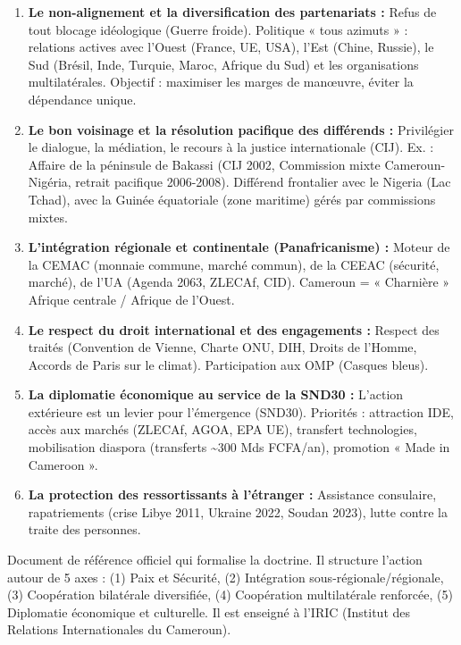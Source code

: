 \documentclass[11pt]{article}
\begin{document}
\begin{propriete}
\begin{enumerate}
    \item \textbf{Le non-alignement et la diversification des partenariats :} Refus de tout blocage idéologique (Guerre froide). Politique « tous azimuts » : relations actives avec l'Ouest (France, UE, USA), l'Est (Chine, Russie), le Sud (Brésil, Inde, Turquie, Maroc, Afrique du Sud) et les organisations multilatérales. Objectif : maximiser les marges de manœuvre, éviter la dépendance unique.
    \item \textbf{Le bon voisinage et la résolution pacifique des différends :} Privilégier le dialogue, la médiation, le recours à la justice internationale (CIJ). Ex. : Affaire de la péninsule de Bakassi (CIJ 2002, Commission mixte Cameroun-Nigéria, retrait pacifique 2006-2008). Différend frontalier avec le Nigeria (Lac Tchad), avec la Guinée équatoriale (zone maritime) gérés par commissions mixtes.
    \item \textbf{L'intégration régionale et continentale (Panafricanisme) :} Moteur de la CEMAC (monnaie commune, marché commun), de la CEEAC (sécurité, marché), de l'UA (Agenda 2063, ZLECAf, CID). Cameroun = « Charnière » Afrique centrale / Afrique de l'Ouest.
    \item \textbf{Le respect du droit international et des engagements :} Respect des traités (Convention de Vienne, Charte ONU, DIH, Droits de l'Homme, Accords de Paris sur le climat). Participation aux OMP (Casques bleus).
    \item \textbf{La diplomatie économique au service de la SND30 :} L'action extérieure est un levier pour l'émergence (SND30). Priorités : attraction IDE, accès aux marchés (ZLECAf, AGOA, EPA UE), transfert technologies, mobilisation diaspora (transferts \textasciitilde 300 Mds FCFA/an), promotion « Made in Cameroon ».
    \item \textbf{La protection des ressortissants à l'étranger :} Assistance consulaire, rapatriements (crise Libye 2011, Ukraine 2022, Soudan 2023), lutte contre la traite des personnes.
\end{enumerate}
\end{propriete}

\begin{savaistu}
Document de référence officiel qui formalise la doctrine. Il structure l'action autour de 5 axes : (1) Paix et Sécurité, (2) Intégration sous-régionale/régionale, (3) Coopération bilatérale diversifiée, (4) Coopération multilatérale renforcée, (5) Diplomatie économique et culturelle. Il est enseigné à l'IRIC (Institut des Relations Internationales du Cameroun).
\end{savaistu}
\end{document}
